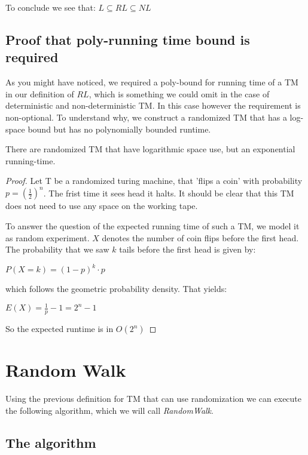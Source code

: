 To conclude we see that: $L \subseteq RL \subseteq NL$

\section{Proof that poly-running time bound is
required}\label{proof-that-poly-running-time-bound-is-required}

As you might have noticed, we required a poly-bound for running time of
a TM in our definition of $RL$, which is something we could omit in the
case of deterministic and non-deterministic TM. In this case however the
requirement is non-optional. To understand why, we construct a
randomized TM that has a log-space bound but has no polynomially bounded
runtime.

\begin{thm}
\label{randomized-poly-runtime}
There are randomized TM that have logarithmic space use, but an exponential running-time.
\end{thm}

\begin{proof}
Let T be a randomized turing machine, that 'flips a coin' with probability $p = {\left(\frac{1}{2}\right)}^n$.
The frist time it sees head it halts. It should be clear that this TM does not need to use any space on the working tape.

To answer the question of the expected running time of such a TM, we model it as random experiment.
$X$ denotes the number of coin flips before the first head. The probability that we saw $k$ tails before the first head is given by:

$P(X = k) = (1-p)^k \cdot p$

which follows the geometric probability density. That yields:

$E(X) = \frac{1}{p} - 1 = 2^n - 1$

So the expected runtime is in $O(2^n)$
\end{proof}

\chapter{Random Walk}\label{random-walk}

Using the previous definition for TM that can use randomization we can
execute the following algorithm, which we will call \emph{RandomWalk}.

\section{The algorithm}\label{the-algorithm}

